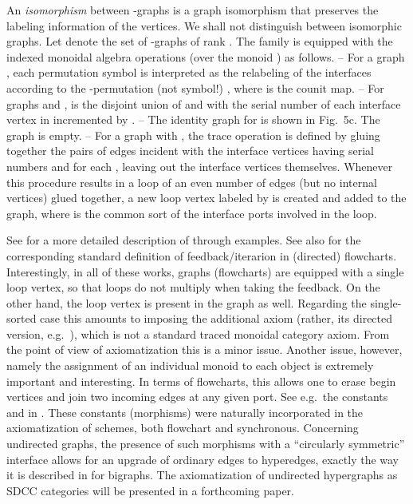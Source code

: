 \documentclass{eptcs}
\begin{document}
An {\em isomorphism\/} between -graphs  is a graph isomorphism that
preserves the labeling information of the vertices. We shall not distinguish between
isomorphic graphs. Let  denote the set of -graphs
of rank . The family  is
equipped with the indexed monoidal algebra operations (over the monoid ) 
as follows.
\vsp\newline
-- For a graph , each permutation symbol  is interpreted as
the relabeling of the interfaces according to the -permutation (not symbol!)
, where  is the counit map.
\newline
-- For graphs  and ,  is the disjoint union of
 and  with the serial number of each interface vertex in  incremented by
.
\newline
-- The identity graph  for  is shown in Fig.~5c. The graph
 is empty.
\newline
-- For a graph  with , the trace operation  is defined by gluing 
together the pairs of edges incident with the interface vertices having serial numbers 
 and  for each , leaving out the interface vertices themselves. 
Whenever this procedure results in a loop of an even number of edges
(but no internal vertices) glued together,
a new loop vertex labeled by  is created and added to the graph, where
 is the common sort of the interface ports involved in the loop. 
\vsp

See \cite{hel} for
a more detailed description of  through examples. See also \cite{elg,blo,acta,tcs}
for the corresponding standard definition of feedback/iterarion in (directed) flow\-charts. 
Interestingly,
in all of these works, graphs (flowcharts) are equipped with a single loop vertex, so that
loops do not multiply when taking the feedback. On the other hand, the loop vertex is present in the 
graph  as well. Regarding the single-sorted case
this amounts to imposing the additional axiom  (rather, its
directed version, e.g.\ \cite[Axiom S5: ]{acta}), which is not
a standard traced monoidal category axiom. From the point of view of axiomatization this is a 
minor issue. Another issue, however, namely the assignment of an
individual monoid to each object  is extremely important and interesting.
In terms of flowcharts,
this allows one to erase begin vertices and join two incoming edges at any given port. 
See e.g.\ the constants  and  in \cite {acta,tcs}. 
These constants (morphisms) were naturally incorporated in the axiomatization of schemes,
both flowchart and synchronous. Concerning undirected
graphs, the presence of such morphisms with a ``circularly symmetric'' interface allows for
an upgrade of ordinary edges to hyperedges, exactly the way it is described in
\cite{mil} for bigraphs. The axiomatization of undirected hypergraphs as SDCC categories 
will be presented in a forthcoming paper.
\end{document}
